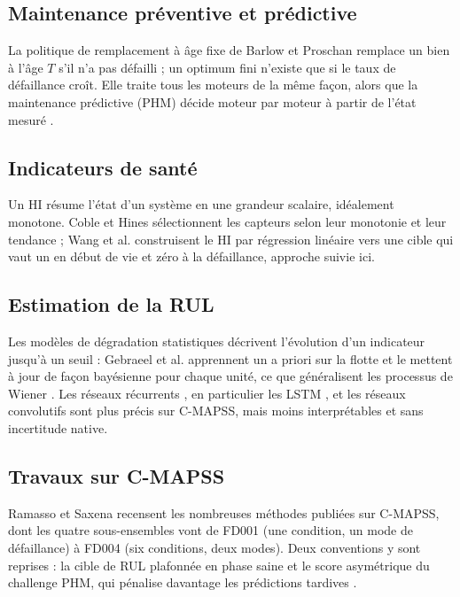 \subsection{Maintenance préventive et prédictive}\label{sec:ea-maintenance}

La politique de remplacement à âge fixe de Barlow et Proschan \cite{barlow1965} remplace un bien à l'âge $T$ s'il n'a pas défailli ; un optimum fini n'existe que si le taux de défaillance croît. Elle traite tous les moteurs de la même façon, alors que la maintenance prédictive (PHM) décide moteur par moteur à partir de l'état mesuré \cite{jardine2006,lei2018}.

\subsection{Indicateurs de santé}\label{sec:ea-hi}

Un HI résume l'état d'un système en une grandeur scalaire, idéalement monotone. Coble et Hines \cite{coble2009} sélectionnent les capteurs selon leur monotonie et leur tendance ; Wang et al. \cite{wang2008} construisent le HI par régression linéaire vers une cible qui vaut un en début de vie et zéro à la défaillance, approche suivie ici.

\subsection{Estimation de la RUL}\label{sec:ea-rul}

Les modèles de dégradation statistiques décrivent l'évolution d'un indicateur jusqu'à un seuil : Gebraeel et al. \cite{gebraeel2005} apprennent un a priori sur la flotte et le mettent à jour de façon bayésienne pour chaque unité, ce que généralisent les processus de Wiener \cite{si2012}. Les réseaux récurrents \cite{heimes2008}, en particulier les LSTM \cite{hochreiter1997,zheng2017}, et les réseaux convolutifs \cite{babu2016,li2018} sont plus précis sur C-MAPSS, mais moins interprétables et sans incertitude native.

\subsection{Travaux sur C-MAPSS}\label{sec:ea-cmapss}

Ramasso et Saxena \cite{ramasso2014} recensent les nombreuses méthodes publiées sur C-MAPSS, dont les quatre sous-ensembles vont de FD001 (une condition, un mode de défaillance) à FD004 (six conditions, deux modes). Deux conventions y sont reprises : la cible de RUL plafonnée en phase saine \cite{heimes2008} et le score asymétrique du challenge PHM, qui pénalise davantage les prédictions tardives \cite{saxena2008damage}.

